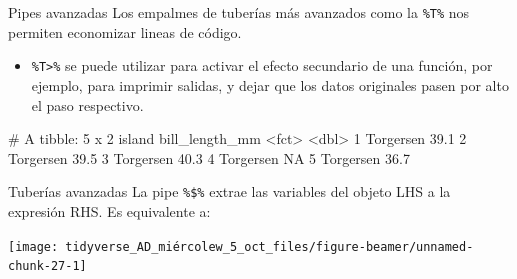 \documentclass[
  ignorenonframetext,
  aspectratio=169]{beamer}
\newenvironment{Shaded}{\begin{snugshade}}{\end{snugshade}}
\newcommand{\AttributeTok}[1]{\textcolor[rgb]{0.77,0.63,0.00}{#1}}
\newcommand{\DecValTok}[1]{\textcolor[rgb]{0.00,0.00,0.81}{#1}}
\newcommand{\FunctionTok}[1]{\textcolor[rgb]{0.00,0.00,0.00}{#1}}
\newcommand{\NormalTok}[1]{#1}
\newcommand{\SpecialCharTok}[1]{\textcolor[rgb]{0.00,0.00,0.00}{#1}}
\newcommand{\StringTok}[1]{\textcolor[rgb]{0.31,0.60,0.02}{#1}}
\providecommand{\tightlist}{%
  \setlength{\itemsep}{0pt}\setlength{\parskip}{0pt}}
\let\oldverbatim\verbatim
\let\endoldverbatim\endverbatim
\renewenvironment{verbatim}{\tiny\oldverbatim}{\endoldverbatim}
\begin{document}
\begin{frame}[fragile]{Pipes avanzadas}
\protect\hypertarget{pipes-avanzadas}{}
Los empalmes de tuberías más avanzados como la \texttt{\%T\%} nos
permiten economizar lineas de código.

\begin{itemize}
\tightlist
\item
  \texttt{\%T\textgreater{}\%} se puede utilizar para activar el efecto
  secundario de una función, por ejemplo, para imprimir salidas, y dejar
  que los datos originales pasen por alto el paso respectivo.
\end{itemize}

\begin{Shaded}
\end{Shaded}

\begin{verbatim}
# A tibble: 5 x 2
  island    bill_length_mm
  <fct>              <dbl>
1 Torgersen           39.1
2 Torgersen           39.5
3 Torgersen           40.3
4 Torgersen           NA  
5 Torgersen           36.7
\end{verbatim}

\begin{verbatim}
[1] 38.9
\end{verbatim}
\end{frame}

\begin{frame}[fragile]{Tuberías avanzadas}
\protect\hypertarget{tuberuxedas-avanzadas}{}
La pipe \texttt{\%\$\%} extrae las variables del objeto LHS a la
expresión RHS. Es equivalente a:

\begin{Shaded}
\end{Shaded}

\begin{Shaded}
\end{Shaded}

\begin{center}\texttt{[image: tidyverse\_AD\_miércolew\_5\_oct\_files/figure-beamer/unnamed-chunk-27-1]} \end{center}
\end{frame}
\end{document}
